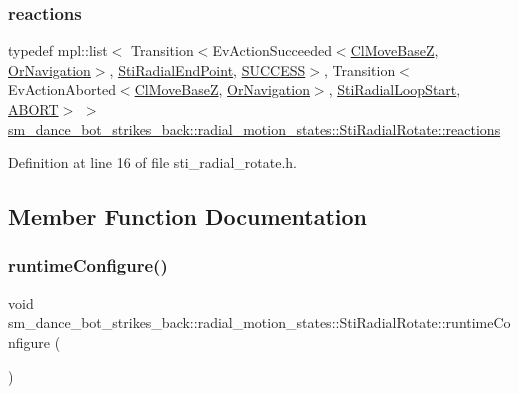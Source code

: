 \subsubsection{\texorpdfstring{reactions}{reactions}}
{\footnotesize\ttfamily typedef mpl\+::list$<$ Transition$<$Ev\+Action\+Succeeded$<$\hyperlink{classcl__move__base__z_1_1ClMoveBaseZ}{Cl\+Move\+BaseZ}, \hyperlink{classsm__dance__bot__strikes__back_1_1OrNavigation}{Or\+Navigation}$>$, \hyperlink{structsm__dance__bot__strikes__back_1_1radial__motion__states_1_1StiRadialEndPoint}{Sti\+Radial\+End\+Point}, \hyperlink{classSUCCESS}{S\+U\+C\+C\+E\+SS}$>$, Transition$<$Ev\+Action\+Aborted$<$\hyperlink{classcl__move__base__z_1_1ClMoveBaseZ}{Cl\+Move\+BaseZ}, \hyperlink{classsm__dance__bot__strikes__back_1_1OrNavigation}{Or\+Navigation}$>$, \hyperlink{structsm__dance__bot__strikes__back_1_1radial__motion__states_1_1StiRadialLoopStart}{Sti\+Radial\+Loop\+Start}, \hyperlink{classABORT}{A\+B\+O\+RT}$>$ $>$ \hyperlink{structsm__dance__bot__strikes__back_1_1radial__motion__states_1_1StiRadialRotate_a22c80365135cc2cff04dbd1f102c3575}{sm\+\_\+dance\+\_\+bot\+\_\+strikes\+\_\+back\+::radial\+\_\+motion\+\_\+states\+::\+Sti\+Radial\+Rotate\+::reactions}}



Definition at line 16 of file sti\+\_\+radial\+\_\+rotate.\+h.



\subsection{Member Function Documentation}
\mbox{\label{structsm__dance__bot__strikes__back_1_1radial__motion__states_1_1StiRadialRotate_a6b91540e76d13bc0a54c940373b13afb}} 
\subsubsection{\texorpdfstring{runtime\+Configure()}{runtimeConfigure()}}
{\footnotesize\ttfamily void sm\+\_\+dance\+\_\+bot\+\_\+strikes\+\_\+back\+::radial\+\_\+motion\+\_\+states\+::\+Sti\+Radial\+Rotate\+::runtime\+Configure (\begin{DoxyParamCaption}{ }\end{DoxyParamCaption})\hspace{0.3cm}{\ttfamily [inline]}}



